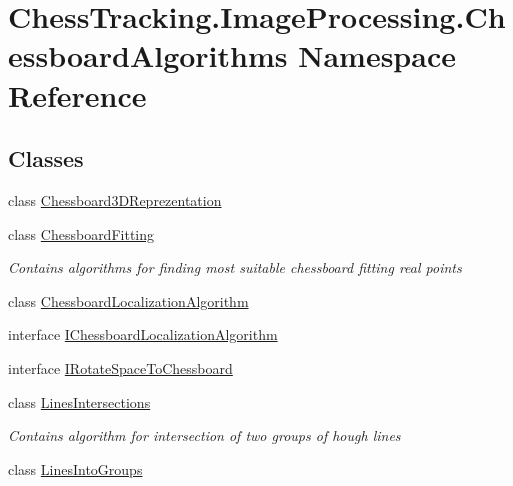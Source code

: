 \hypertarget{namespace_chess_tracking_1_1_image_processing_1_1_chessboard_algorithms}{}\section{Chess\+Tracking.\+Image\+Processing.\+Chessboard\+Algorithms Namespace Reference}
\label{namespace_chess_tracking_1_1_image_processing_1_1_chessboard_algorithms}
\subsection*{Classes}
\begin{DoxyCompactItemize}
\item 
class \mbox{\hyperlink{class_chess_tracking_1_1_image_processing_1_1_chessboard_algorithms_1_1_chessboard3_d_reprezentation}{Chessboard3\+D\+Reprezentation}}
\item 
class \mbox{\hyperlink{class_chess_tracking_1_1_image_processing_1_1_chessboard_algorithms_1_1_chessboard_fitting}{Chessboard\+Fitting}}
\begin{DoxyCompactList}\small\item\em Contains algorithms for finding most suitable chessboard fitting real points \end{DoxyCompactList}\item 
class \mbox{\hyperlink{class_chess_tracking_1_1_image_processing_1_1_chessboard_algorithms_1_1_chessboard_localization_algorithm}{Chessboard\+Localization\+Algorithm}}
\item 
interface \mbox{\hyperlink{interface_chess_tracking_1_1_image_processing_1_1_chessboard_algorithms_1_1_i_chessboard_localization_algorithm}{I\+Chessboard\+Localization\+Algorithm}}
\item 
interface \mbox{\hyperlink{interface_chess_tracking_1_1_image_processing_1_1_chessboard_algorithms_1_1_i_rotate_space_to_chessboard}{I\+Rotate\+Space\+To\+Chessboard}}
\item 
class \mbox{\hyperlink{class_chess_tracking_1_1_image_processing_1_1_chessboard_algorithms_1_1_lines_intersections}{Lines\+Intersections}}
\begin{DoxyCompactList}\small\item\em Contains algorithm for intersection of two groups of hough lines \end{DoxyCompactList}\item 
class \mbox{\hyperlink{class_chess_tracking_1_1_image_processing_1_1_chessboard_algorithms_1_1_lines_into_groups}{Lines\+Into\+Groups}}

\end{DoxyCompactItemize}
